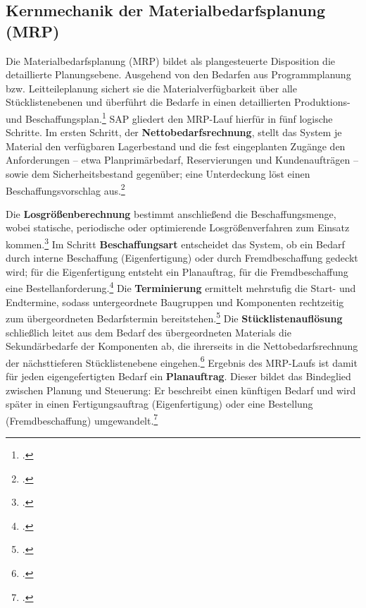 \subsection{Kernmechanik der Materialbedarfsplanung (MRP)}
Die Materialbedarfsplanung (MRP) bildet als plangesteuerte Disposition die detaillierte Planungsebene. Ausgehend von den Bedarfen aus Programmplanung bzw. Leitteileplanung sichert sie die Materialverfügbarkeit über alle Stücklistenebenen und überführt die Bedarfe in einen detaillierten Produktions- und Beschaffungsplan.\footcites[Vgl.][Folie 35 u. 37]{SAPUCC.2023}[ergänzend][S. 42 ff.]{Kurbel.2021} SAP gliedert den MRP-Lauf hierfür in fünf logische Schritte. Im ersten Schritt, der \textbf{Nettobedarfsrechnung}, stellt das System je Material den verfügbaren Lagerbestand und die fest eingeplanten Zugänge den Anforderungen -- etwa Planprimärbedarf, Reservierungen und Kundenaufträgen -- sowie dem Sicherheitsbestand gegenüber; eine Unterdeckung löst einen Beschaffungsvorschlag aus.\footcite[Vgl.][Folie 38]{SAPUCC.2023}

Die \textbf{Losgrößenberechnung} bestimmt anschließend die Beschaffungsmenge, wobei statische, periodische oder optimierende Losgrößenverfahren zum Einsatz kommen.\footcite[Vgl.][Folie 39]{SAPUCC.2023} Im Schritt \textbf{Beschaffungsart} entscheidet das System, ob ein Bedarf durch interne Beschaffung (Eigenfertigung) oder durch Fremdbeschaffung gedeckt wird; für die Eigenfertigung entsteht ein Planauftrag, für die Fremdbeschaffung eine Bestellanforderung.\footcite[Vgl.][Folie 40]{SAPUCC.2023} Die \textbf{Terminierung} ermittelt mehrstufig die Start- und Endtermine, sodass untergeordnete Baugruppen und Komponenten rechtzeitig zum übergeordneten Bedarfstermin bereitstehen.\footcite[Vgl.][Folie 41]{SAPUCC.2023} Die \textbf{Stücklistenauflösung} schließlich leitet aus dem Bedarf des übergeordneten Materials die Sekundärbedarfe der Komponenten ab, die ihrerseits in die Nettobedarfsrechnung der nächsttieferen Stücklistenebene eingehen.\footcites[Vgl.][Folie 35 u. 37]{SAPUCC.2023}[][S. 88 ff.]{Kurbel.2021} Ergebnis des MRP-Laufs ist damit für jeden eigengefertigten Bedarf ein \textbf{Planauftrag}. Dieser bildet das Bindeglied zwischen Planung und Steuerung: Er beschreibt einen künftigen Bedarf und wird später in einen Fertigungsauftrag (Eigenfertigung) oder eine Bestellung (Fremdbeschaffung) umgewandelt.\footcite[Vgl.][Folie 44 f.]{SAPUCC.2023}

